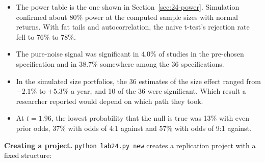 \begin{itemize}
  \item The power table is the one shown in Section~\ref{sec:24-power}. Simulation confirmed about 80\% power at the computed sample sizes with normal returns. With fat tails and autocorrelation, the naive t-test's rejection rate fell to 76\% to 78\%.
  \item The pure-noise signal was significant in 4.0\% of studies in the pre-chosen specification and in 38.7\% somewhere among the 36 specifications.
  \item In the simulated size portfolios, the 36 estimates of the size effect ranged from $-2.1\%$ to $+5.3\%$ a year, and 10 of the 36 were significant. Which result a researcher reported would depend on which path they took.
  \item At $t = 1.96$, the lowest probability that the null is true was 13\% with even prior odds, 37\% with odds of 4:1 against and 57\% with odds of 9:1 against.
\end{itemize}


\textbf{Creating a project.} \texttt{python lab24.py new} creates a replication project with a fixed structure:

